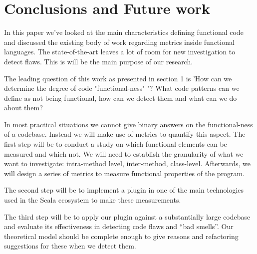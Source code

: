 \documentclass{article}
\begin{document}
\section{Conclusions and Future work}
In this paper we've looked at the main characteristics defining functional code and discussed the existing body of work regarding metrics inside functional languages. The state-of-the-art leaves a lot of room for new investigation to detect flaws. This is will be the main purpose of our research.

The leading question of this work as presented in  section 1  is  'How can we determine the degree of code "functional-ness" '? What code patterns can we define as not being functional, how can we detect them and what can we do about them? \par

In most practical situations we cannot give binary answers on the functional-ness of a codebase. Instead we will make use of metrics to quantify this aspect. The first step will be to conduct a study on which functional elements can be measured and which not. We will need to establish the granularity of what we want to investigate: intra-method level, inter-method, class-level. Afterwards, we will design a series of metrics to measure functional properties of the program. \par

The second step will be to implement a plugin in one of the main technologies used in the Scala ecosystem to make these measurements.\par

The third step will be to apply our plugin against a substantially large codebase and evaluate its effectiveness in detecting code flaws and ``bad smells''. Our theoretical model should be complete enough to give reasons and refactoring suggestions for these when we detect them.



\newpage


 

\end{document}
